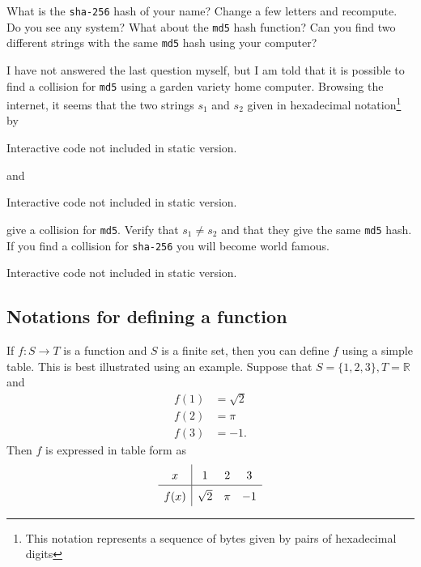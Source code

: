 \begin{exercise}
  What is the \texttt{sha-256} hash of your name? Change a
  few letters and recompute. Do you see any system? What about the \texttt{md5} hash function?
  Can you find two different strings with the same \texttt{md5} hash using your computer?

  \begin{hint}
    I have not answered the last question myself, but I am told that it is possible to find
    a collision for \texttt{md5} using a garden variety home computer. Browsing the internet, it
    seems that the two strings $s_1$ and $s_2$ given in hexadecimal notation\footnote{This notation represents a sequence of bytes given by pairs of hexadecimal digits} by
    \begin{sage} Interactive code not included in static version.\end{sage}
    and
    \begin{sage} Interactive code not included in static version.\end{sage}
    give a collision for \texttt{md5}. Verify that $s_1\neq s_2$ and
    that they give the same \texttt{md5} hash. If you find a collision
    for \texttt{sha-256} you will
    become world famous.

    \begin{hint}
      \begin{sage} Interactive code not included in static version.\end{sage}
    \end{hint}
  \end{hint}
\end{exercise}

\subsection{Notations for defining a function}

If $f: S\rightarrow T$ is a function and $S$ is a finite set, then you can
define $f$ using a simple table. This is best illustrated using an
example. Suppose that $S = \{1, 2, 3\}, T = \mathbb{R}$ and
\begin{align*}
  f(1) & = \sqrt{2} \\
  f(2) & = \pi      \\
  f(3) & = -1.
\end{align*}
Then $f$ is expressed in table form as
$$
  \def\arraystretch{1.5}
  \begin{array}{c|ccccccc}
    x    & 1        & 2   & 3  \\ \hline
    f(x) & \sqrt{2} & \pi & -1
  \end{array}
$$

